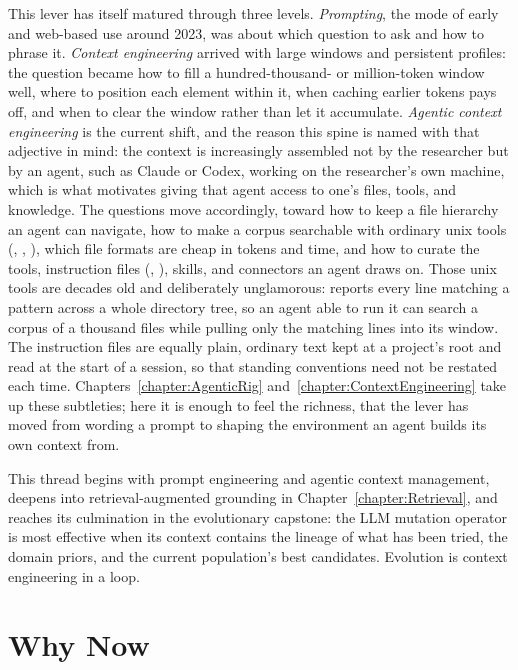 This lever has itself matured through three levels.
\emph{Prompting}, the mode of early and web-based use around 2023, was about which question to ask and how to phrase it.
\emph{Context engineering} arrived with large windows and persistent profiles: the question became how to fill a hundred-thousand- or million-token window well, where to position each element within it, when caching earlier tokens pays off, and when to clear the window rather than let it accumulate.
\emph{Agentic context engineering} is the current shift, and the reason this spine is named with that adjective in mind: the context is increasingly assembled not by the researcher but by an agent, such as Claude or Codex, working on the researcher's own machine, which is what motivates giving that agent access to one's files, tools, and knowledge.
The questions move accordingly, toward how to keep a file hierarchy an agent can navigate, how to make a corpus searchable with ordinary unix tools (, , ), which file formats are cheap in tokens and time, and how to curate the tools, instruction files (, ), skills, and connectors an agent draws on.
Those unix tools are decades old and deliberately unglamorous:  reports every line matching a pattern across a whole directory tree, so an agent able to run it can search a corpus of a thousand files while pulling only the matching lines into its window.
The instruction files are equally plain, ordinary text kept at a project's root and read at the start of a session, so that standing conventions need not be restated each time.
Chapters~\ref{chapter:AgenticRig} and~\ref{chapter:ContextEngineering} take up these subtleties; here it is enough to feel the richness, that the lever has moved from wording a prompt to shaping the environment an agent builds its own context from.

This thread begins with prompt engineering and agentic context management, deepens into retrieval-augmented grounding in Chapter~\ref{chapter:Retrieval}, and reaches its culmination in the evolutionary capstone: the LLM mutation operator is most effective when its context contains the lineage of what has been tried, the domain priors, and the current population's best candidates.
Evolution is context engineering in a loop.

\section{Why Now}

